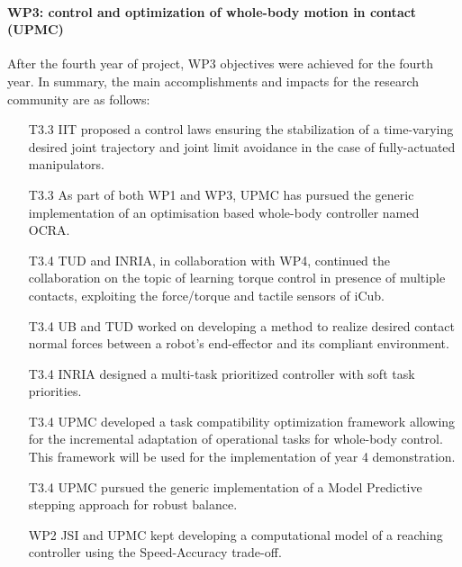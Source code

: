 

 
\paragraph*{WP3: control and optimization of whole-body motion in contact (UPMC)}

After the fourth year of project, WP3 objectives were achieved for the fourth year. In summary, the main accomplishments and impacts for the research community are as follows: 

\begin{itemize}

\item[T3.3] IIT proposed a control laws ensuring the stabilization of a time-varying desired joint trajectory and joint limit avoidance in the case of fully-actuated manipulators.
\item[T3.3] As part of both WP1 and WP3, UPMC has pursued the generic implementation of an optimisation based whole-body controller named OCRA. 
\item[T3.4] TUD and INRIA, in collaboration with WP4, continued the collaboration on the topic of learning torque control in presence of multiple contacts, exploiting the force/torque and tactile sensors of iCub.
\item[T3.4] UB and TUD worked on developing a method to realize desired contact normal forces between a robot's end-effector and its compliant
environment.
\item[T3.4] INRIA designed a multi-task prioritized controller with soft task priorities.
\item[T3.4] UPMC developed a task compatibility optimization framework allowing for the incremental adaptation of operational tasks for whole-body control. This framework will be used for the implementation of year 4 demonstration.
\item[T3.4] UPMC pursued the generic implementation of a Model Predictive stepping approach for robust balance.
\item[WP2] JSI and UPMC kept developing a computational model of a reaching controller using the Speed-Accuracy trade-off.

 \end{itemize}

